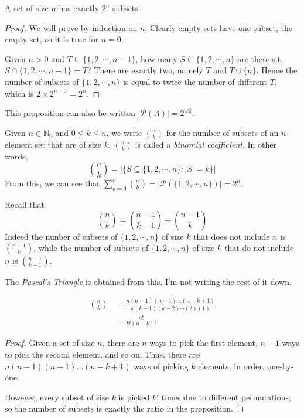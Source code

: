 \documentclass[12pt]{article}
\begin{document}
\begin{prop}
    A set of size $n$ has exactly $2^{n}$ subsets.
\end{prop}
\begin{proof}
    We will prove by induction on $n$.
    Clearly empty sets have one subset, the empty set,
    so it is true for $n=0$.

    Given $n > 0$ and $T \subseteq \{1,2,\cdots,n-1\}$,
    how many $S \subseteq \{1,2,\cdots,n\}$ are there
    s.t. $S \cap \{1,2,\cdots,n-1\} = T$?
    There are exactly two, namely $T$ and $T \cup \{n\}$.
    Hence the number of subsets of $\{1,2,\cdots,n\}$
    is equal to twice the number of different $T$,
    which is $2 \times 2^{n-1} = 2^{n}$.
\end{proof}

This proposition can also be written $|\mathcal{P}(A)| = 2^{|A|}$.

Given $n \in \mathbb{N}_0$ and $0 \le k \le n$, we write $\binom nk$
for the number of subsets of an $n$-element set
that are of size $k$. $\binom nk$ is
called a \emph{binomial coefficient}. In other words,
\[
\binom nk = \biggl|\{S \subseteq \{1,2,\cdots,n\}: |S| = k\}\biggr|
\]
From this, we can see that $\sum_{k=0}^{n}\binom nk = |\mathcal{P}(\{1,2,\cdots,n\})| = 2^{n}$.

Recall that
\[
    \binom nk = \binom{n-1}{k-1}+\binom{n-1}k
\]
Indeed the nunber of subsets
of $\{1,2,\cdots,n\}$ of size $k$ that does not include
$n$ is $\binom{n-1}k$, while the number of subsets of $\{1,2,\cdots,n\}$ of
size $k$ that do not include $n$ is $\binom{n-1}{k-1}$.

The \emph{Pascal's Triangle} is obtained from this.
I'm not writing the rest of it down.

\begin{prop}
    \begin{align*}
        \binom nk 
        &= \frac{n(n-1)(n-1)\dots(n-k+1)}{k(k-1)(k-2)\cdots(2)(1)}\\
        &= \frac{n!}{k!(n-k)!}
    \end{align*}
\end{prop}
\begin{proof}
    Given a set of size $n$, there
    are $n$ ways to pick the first element,
    $n-1$ ways to pick the second element,
    and so on. Thus,
    there are $n(n-1)(n-1)\dots(n-k+1)$ ways of picking $k$ elements,
    in order, one-by-one.

    However, every subset of size $k$ is
    picked $k!$ times due to different permutations,
    so the number of subsets is exactly the ratio in the proposition.
\end{proof}
\end{document}
